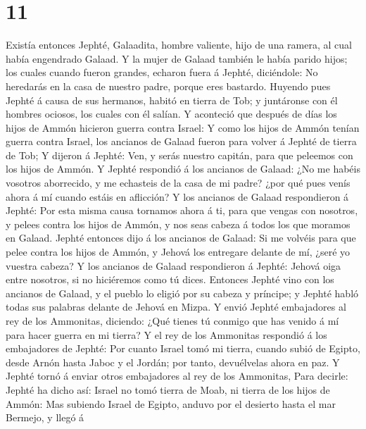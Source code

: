 \hypertarget{section-10}{%
\section{11}\label{section-10}}

 Existía entonces Jephté, Galaadita, hombre valiente, hijo
de una ramera, al cual había engendrado Galaad.  Y la
mujer de Galaad también le había parido hijos; los cuales cuando fueron
grandes, echaron fuera á Jephté, diciéndole: No heredarás en la casa de
nuestro padre, porque eres bastardo.  Huyendo pues Jephté
á causa de sus hermanos, habitó en tierra de Tob; y juntáronse con él
hombres ociosos, los cuales con él salían.  Y aconteció
que después de días los hijos de Ammón hicieron guerra contra Israel:
 Y como los hijos de Ammón tenían guerra contra Israel,
los ancianos de Galaad fueron para volver á Jephté de tierra de Tob;
 Y dijeron á Jephté: Ven, y serás nuestro capitán, para
que peleemos con los hijos de Ammón.  Y Jephté respondió á
los ancianos de Galaad: ¿No me habéis vosotros aborrecido, y me
echasteis de la casa de mi padre? ¿por qué pues venís ahora á mí cuando
estáis en aflicción?  Y los ancianos de Galaad
respondieron á Jephté: Por esta misma causa tornamos ahora á ti, para
que vengas con nosotros, y pelees contra los hijos de Ammón, y nos seas
cabeza á todos los que moramos en Galaad.  Jephté entonces
dijo á los ancianos de Galaad: Si me volvéis para que pelee contra los
hijos de Ammón, y Jehová los entregare delante de mí, ¿seré yo vuestra
cabeza?  Y los ancianos de Galaad respondieron á Jephté:
Jehová oiga entre nosotros, si no hiciéremos como tú dices.
 Entonces Jephté vino con los ancianos de Galaad, y el
pueblo lo eligió por su cabeza y príncipe; y Jephté habló todas sus
palabras delante de Jehová en Mizpa.  Y envió Jephté
embajadores al rey de los Ammonitas, diciendo: ¿Qué tienes tú conmigo
que has venido á mí para hacer guerra en mi tierra?  Y el
rey de los Ammonitas respondió á los embajadores de Jephté: Por cuanto
Israel tomó mi tierra, cuando subió de Egipto, desde Arnón hasta Jaboc y
el Jordán; por tanto, devuélvelas ahora en paz.  Y Jephté
tornó á enviar otros embajadores al rey de los Ammonitas,
 Para decirle: Jephté ha dicho así: Israel no tomó tierra
de Moab, ni tierra de los hijos de Ammón:  Mas subiendo
Israel de Egipto, anduvo por el desierto hasta el mar Bermejo, y llegó á
